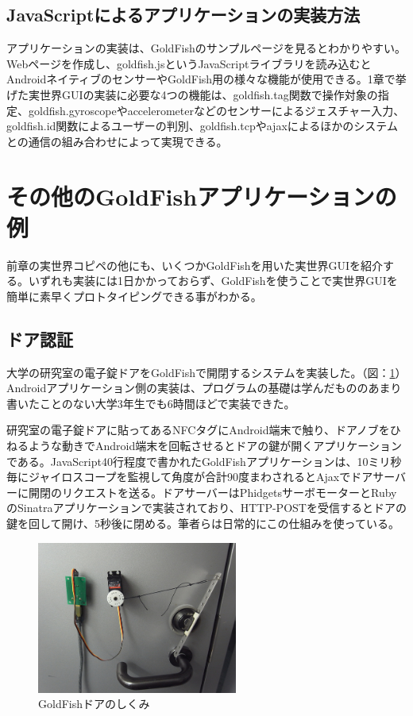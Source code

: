 \subsection{JavaScriptによるアプリケーションの実装方法}
アプリケーションの実装は、GoldFishのサンプルページ\cite{sample}を見るとわかりやすい。Webページを作成し、goldfish.jsというJavaScriptライブラリを読み込むとAndroidネイティブのセンサーやGoldFish用の様々な機能が使用できる。1章で挙げた実世界GUIの実装に必要な4つの機能は、goldfish.tag関数で操作対象の指定、goldfish.gyroscopeやaccelerometerなどのセンサーによるジェスチャー入力、goldfish.id関数によるユーザーの判別、goldfish.tcpやajaxによるほかのシステムとの通信の組み合わせによって実現できる。


\section{その他のGoldFishアプリケーションの例}
前章の実世界コピペの他にも、いくつかGoldFishを用いた実世界GUIを紹介する。いずれも実装には1日かかっておらず、GoldFishを使うことで実世界GUIを簡単に素早くプロトタイピングできる事がわかる。

\subsection{ドア認証}
大学の研究室の電子錠ドアをGoldFishで開閉するシステムを実装した。（図：\ref{fig:door}）Androidアプリケーション側の実装は、プログラムの基礎は学んだもののあまり書いたことのない大学3年生でも6時間ほどで実装できた。

研究室の電子錠ドアに貼ってあるNFCタグにAndroid端末で触り、ドアノブをひねるような動きでAndroid端末を回転させるとドアの鍵が開くアプリケーションである。JavaScript40行程度で書かれたGoldFishアプリケーションは、10ミリ秒毎にジャイロスコープを監視して角度が合計90度まわされるとAjaxでドアサーバーに開閉のリクエストを送る。ドアサーバーはPhidgetsサーボモーターとRubyのSinatraアプリケーションで実装されており、HTTP-POSTを受信するとドアの鍵を回して開け、5秒後に閉める。筆者らは日常的にこの仕組みを使っている。

\begin{figure}
  \begin{center}
    \includegraphics[height=50mm]{img/door.png}
  \end{center}
  \caption{GoldFishドアのしくみ}
  \label{fig:door}
\end{figure}


